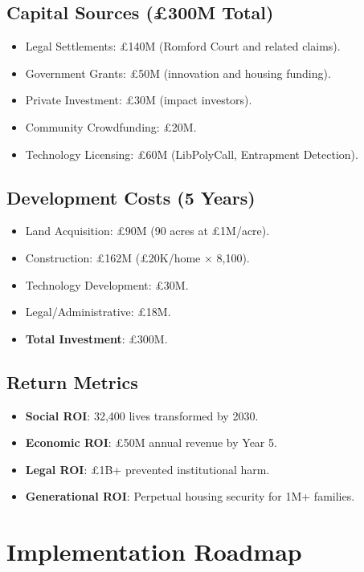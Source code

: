 \documentclass[12pt]{article}\usepackage[a4paper,margin=1in]{geometry}
\begin{document}
\subsection*{Capital Sources (£300M Total)}
\begin{itemize}
    \item Legal Settlements: £140M (Romford Court and related claims).
    \item Government Grants: £50M (innovation and housing funding).
    \item Private Investment: £30M (impact investors).
    \item Community Crowdfunding: £20M.
    \item Technology Licensing: £60M (LibPolyCall, Entrapment Detection).
\end{itemize}\subsection*{Development Costs (5 Years)}
\begin{itemize}
    \item Land Acquisition: £90M (90 acres at £1M/acre).
    \item Construction: £162M (£20K/home × 8,100).
    \item Technology Development: £30M.
    \item Legal/Administrative: £18M.
    \item \textbf{Total Investment}: £300M.
\end{itemize}\subsection*{Return Metrics}
\begin{itemize}
    \item \textbf{Social ROI}: 32,400 lives transformed by 2030.
    \item \textbf{Economic ROI}: £50M annual revenue by Year 5.
    \item \textbf{Legal ROI}: £1B+ prevented institutional harm.
    \item \textbf{Generational ROI}: Perpetual housing security for 1M+ families.
\end{itemize}\section*{Implementation Roadmap}
\end{document}
